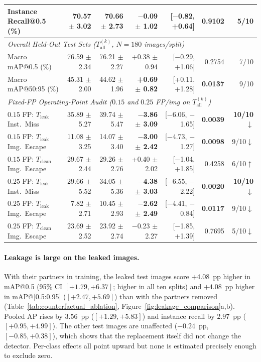 \documentclass[pdflatex,sn-apa]{sn-jnl}
\begin{document}
\begin{table}[htbp]
\begin{tabular*}{\textwidth}{@{\extracolsep{\fill}} l r r r r r r}
Instance Recall@0.5 (\%) & 70.57 $\pm$ 3.02 & 70.66 $\pm$ 2.73 & $-$0.09 $\pm$ 1.02 & [$-$0.82, +0.64] & 0.9102 & 5/10 \\
\midrule
\multicolumn{7}{l}{\textit{Overall Held-Out Test Sets ($T_{\text{all}}^{(k)}$, $N=180$ images/split)}} \\
Macro mAP@0.5 (\%) & 76.59 $\pm$ 2.34 & 76.21 $\pm$ 2.27 & +0.38 $\pm$ 0.94 & [$-$0.29, +1.06] & 0.2754 & 7/10 \\
Macro mAP@50:95 (\%) & 45.31 $\pm$ 2.00 & 44.62 $\pm$ 1.96 & \textbf{+0.69 $\pm$ 0.82} & [+0.11, +1.28] & \textbf{0.0137} & 9/10 \\
\midrule
\multicolumn{7}{l}{\textit{Fixed-FP Operating-Point Audit ($0.15$ and $0.25$ FP/img on $T_{\text{all}}^{(k)}$)}} \\
$0.15$ FP: $T_{\text{leak}}$ Inst.\ Miss & 35.89 $\pm$ 5.27 & 39.74 $\pm$ 5.47 & \textbf{$-$3.86 $\pm$ 3.09} & [$-$6.06, $-$1.65] & \textbf{0.0039} & \textbf{10/10}$\downarrow$ \\
$0.15$ FP: $T_{\text{leak}}$ Img.\ Escape & 11.08 $\pm$ 3.25 & 14.07 $\pm$ 3.40 & \textbf{$-$3.00 $\pm$ 2.42} & [$-$4.73, $-$1.27] & \textbf{0.0098} & 9/10$\downarrow$ \\
$0.15$ FP: $T_{\text{clean}}$ Img.\ Escape & 29.67 $\pm$ 2.44 & 29.26 $\pm$ 2.76 & +0.40 $\pm$ 2.02 & [$-$1.04, +1.85] & 0.4258 & 6/10$\uparrow$ \\
$0.25$ FP: $T_{\text{leak}}$ Inst.\ Miss & 29.66 $\pm$ 5.52 & 34.05 $\pm$ 5.36 & \textbf{$-$4.38 $\pm$ 3.03} & [$-$6.55, $-$2.22] & \textbf{0.0020} & \textbf{10/10}$\downarrow$ \\
$0.25$ FP: $T_{\text{leak}}$ Img.\ Escape & 7.82 $\pm$ 2.71 & 10.45 $\pm$ 2.93 & \textbf{$-$2.62 $\pm$ 2.49} & [$-$4.41, $-$0.84] & \textbf{0.0117} & 9/10$\downarrow$ \\
$0.25$ FP: $T_{\text{clean}}$ Img.\ Escape & 23.69 $\pm$ 2.52 & 23.92 $\pm$ 2.74 & $-$0.23 $\pm$ 2.27 & [$-$1.85, +1.39] & 0.7695 & 5/10$\downarrow$ \\
\bottomrule
\end{tabular*}
\end{table}

\paragraph{Leakage is large on the leaked images.} With their partners in training, the leaked test images score $+4.08$~pp higher in mAP@0.5 (95\% CI $[+1.79,+6.37]$; higher in all ten splits) and $+4.08$~pp higher in mAP@[0.5:0.95] ($[+2.47,+5.69]$) than with the partners removed (Table~\ref{tab:counterfactual_ablation}, Figure~\ref{fig:leakage_comparison}a,b). Pooled AP rises by $3.56$~pp ($[+1.29,+5.83]$) and instance recall by $2.97$~pp ($[+0.95,+4.99]$). The other test images are unaffected ($-0.24$~pp, $[-0.85,+0.38]$), which shows that the replacement itself did not change the detector. Per-class effects all point upward but none is estimated precisely enough to exclude zero.
\end{document}
